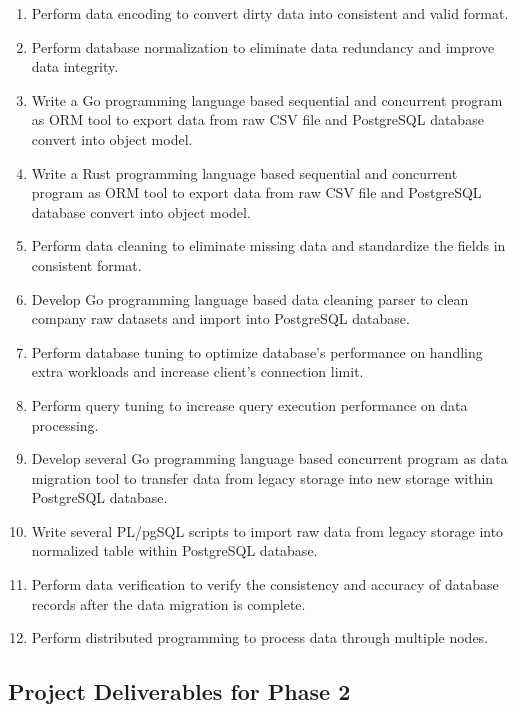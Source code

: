 \begin{enumerate}[topsep=0pt,itemsep=-1ex,partopsep=1ex,parsep=1.5ex]
\item Perform data encoding to convert dirty data into consistent and valid format. 
\item Perform database normalization to eliminate data redundancy and improve data integrity. 
\item Write a Go programming language based sequential and concurrent program as ORM tool to export data from raw CSV file and PostgreSQL database convert into object model.
\item Write a Rust programming language based sequential and concurrent program as ORM tool to export data from raw CSV file and PostgreSQL database convert into object model.
\item Perform data cleaning to eliminate missing data and standardize the fields in consistent format. 
\item Develop Go programming language based data cleaning parser to clean company raw datasets and import into PostgreSQL database. 
\item Perform database tuning to optimize database's performance on handling extra workloads and increase client's connection limit. 
\item Perform query tuning to increase query execution performance on data processing. 
\item Develop several Go programming language based concurrent program as data migration tool to transfer data from legacy storage into new storage within PostgreSQL database. 
\item Write several PL/pgSQL scripts to import raw data from legacy storage into normalized table within PostgreSQL database. 
\item Perform data verification to verify the consistency and accuracy of database records after the data migration is complete. 
\item Perform distributed programming to process data through multiple nodes.

\end{enumerate}

\subsection{Project Deliverables for Phase 2}

